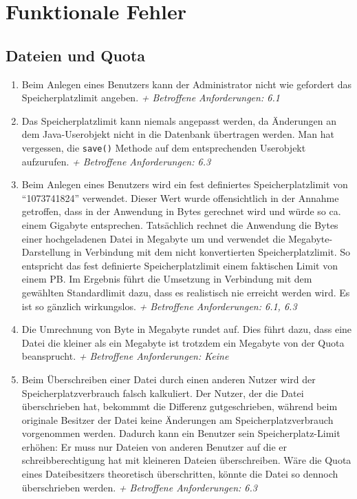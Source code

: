 \documentclass[12pt,DIV14,BCOR10mm,a4paper,parskip=half-,headsepline,headinclude,english,ngerman,bibliography=totocnumbered]{scrreprt}
\begin{document}
\chapter{Funktionale Fehler}


\section{Dateien und Quota}

\begin{enumerate}
\item Beim Anlegen eines Benutzers kann der Administrator nicht wie gefordert das Speicherplatzlimit angeben.\newline
\textit{+ Betroffene Anforderungen: 6.1}

\item Das Speicherplatzlimit kann niemals angepasst werden, da Änderungen an dem Java-Userobjekt nicht in die Datenbank übertragen werden. Man hat vergessen, die \texttt{save()} Methode auf dem entsprechenden Userobjekt aufzurufen.\newline
\textit{+ Betroffene Anforderungen: 6.3}

\item Beim Anlegen eines Benutzers wird ein fest definiertes Speicherplatzlimit von \enquote{1073741824} verwendet. Dieser Wert wurde offensichtlich in der Annahme getroffen, dass in der Anwendung in Bytes gerechnet wird und würde so ca. einem Gigabyte entsprechen. Tatsächlich rechnet die Anwendung die Bytes einer hochgeladenen Datei in Megabyte um und verwendet die Megabyte-Darstellung in Verbindung mit dem nicht konvertierten Speicherplatzlimit. So entspricht das fest definierte Speicherplatzlimit einem faktischen Limit von einem PB. Im Ergebnis führt die Umsetzung in Verbindung mit dem gewählten Standardlimit dazu, dass es realistisch nie erreicht werden wird. Es ist so gänzlich wirkungslos.\newline
\textit{+ Betroffene Anforderungen: 6.1, 6.3}

\item Die Umrechnung von Byte in Megabyte rundet auf. Dies führt dazu, dass eine Datei die kleiner als ein Megabyte ist trotzdem ein Megabyte von der Quota beansprucht.\newline
\textit{+ Betroffene Anforderungen: Keine}

\item Beim Überschreiben einer Datei durch einen anderen Nutzer wird der Speicherplatzverbrauch falsch kalkuliert. Der Nutzer, der die Datei überschrieben hat, bekommmt die Differenz gutgeschrieben, während beim originale Besitzer der Datei keine Änderungen am Speicherplatzverbrauch vorgenommen werden. Dadurch kann ein Benutzer sein Speicherplatz-Limit erhöhen: Er muss nur Dateien von anderen Benutzer auf die er schreibberechtigung hat mit kleineren Dateien überschreiben. Wäre die Quota eines Dateibesitzers theoretisch überschritten, könnte die Datei so dennoch überschrieben werden.\newline
\textit{+ Betroffene Anforderungen: 6.3}


\end{enumerate}
\end{document}
